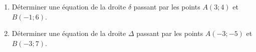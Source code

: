 
\begin{enumerate}
\item Déterminer une équation de la droite $\delta$ passant par les points $A(3;4)$ et $B(-1;6)$. 
\item Déterminer une équation de la droite $\Delta$ passant par les points $A(-3;-5)$ et $B(-3;7)$.
\end{enumerate}